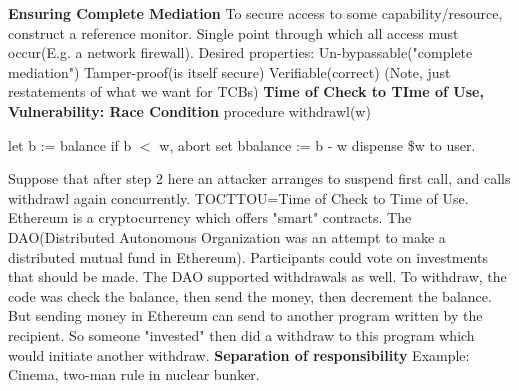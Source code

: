 \documentclass[11 pt]{scrartcl}
\begin{document}
\textbf{Ensuring Complete Mediation}\newline
To secure access to some capability/resource, construct a reference monitor. Single point through which all access must occur(E.g. a network firewall). \newline Desired properties:
\itemnum
    \ii Un-bypassable("complete mediation")
    \ii Tamper-proof(is itself secure)
    \ii Verifiable(correct)
    \ii (Note, just restatements of what we want for TCBs)
\itemend
\textbf{Time of Check to TIme of Use, Vulnerability: Race Condition}\newline
procedure withdrawl(w)
\begin{enumerate}
    \ii let b := balance
    \ii if b $<$ w, abort
    \ii set bbalance := b - w
    \ii dispense \$w to user.
\end{enumerate}
Suppose that after step 2 here an attacker arranges to suspend first call, and calls withdrawl again concurrently.\newline
TOCTTOU=Time of Check to Time of Use.\newline
Ethereum is a cryptocurrency which offers "smart" contracts. The DAO(Distributed Autonomous Organization was an attempt to make a distributed mutual fund in Ethereum). Participants could vote on investments that should be made. The DAO supported withdrawals as well. To withdraw, the code was check the balance, then send the money, then decrement the balance. But sending money in Ethereum can send to another program written by the recipient. So someone "invested" then did a withdraw to this program which would initiate another withdraw.\newline 
\textbf{Separation of responsibility}
Example: Cinema, two-man rule in nuclear bunker.
\end{document}
